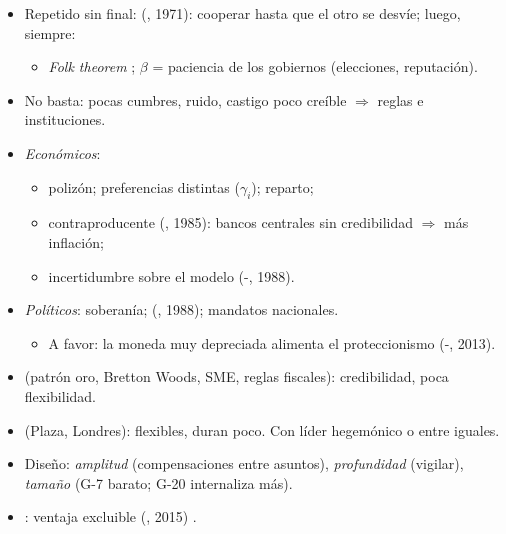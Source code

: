 \documentclass{article}
\begin{document}
\begin{columnas}
\begin{itemize}
\begin{itemize}
  \end{itemize}
\item Repetido sin final:  (, 1971): cooperar hasta que el otro se desvíe; luego,  siempre:
  \begin{itemize}
  \item \emph{Folk theorem} ; $\beta$ = paciencia de los gobiernos (elecciones, reputación).
  \end{itemize}
\item No basta: pocas cumbres, ruido, castigo poco creíble $\Rightarrow$ reglas e instituciones.
\end{itemize}

\begin{itemize}
\item \emph{Económicos}:
  \begin{itemize}
  \item polizón; preferencias distintas ($\gamma_i$); reparto;
  \item contraproducente (, 1985): bancos centrales sin credibilidad $\Rightarrow$ más inflación;
  \item incertidumbre sobre el modelo (-, 1988).
  \end{itemize}
\item \emph{Políticos}: soberanía;  (, 1988); mandatos nacionales.
  \begin{itemize}
  \item A favor: la moneda muy depreciada alimenta el proteccionismo (-, 2013).
  \end{itemize}
\end{itemize}
\begin{itemize}
\item {} (patrón oro, Bretton Woods, SME, reglas fiscales): credibilidad, poca flexibilidad.
\item {} (Plaza, Londres): flexibles, duran poco. Con líder hegemónico o entre iguales.
\end{itemize}
\begin{itemize}
\item Diseño: \emph{amplitud} (compensaciones entre asuntos), \emph{profundidad} (vigilar), \emph{tamaño} (G-7 barato; G-20 internaliza más).
\item {}: ventaja excluible (, 2015) .
\end{itemize}


\end{columnas}
\end{document}

